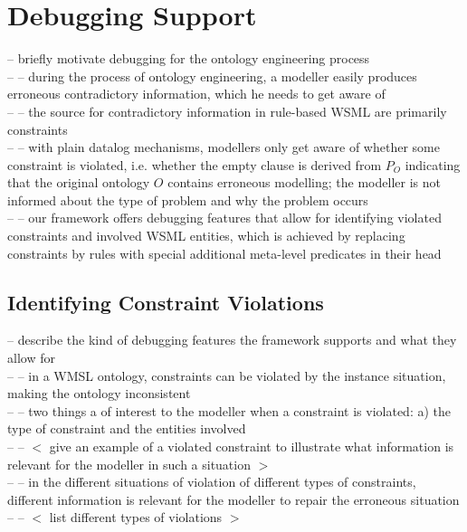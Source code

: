 \def\transdebug{\transtxt{debug}}
\def\pvotype{\predicate{\predsubtxt{v\_otype}}}
\def\pvmincard{\predicate{\predsubtxt{v\_mincard}}}
\def\pvmaxcard{\predicate{\predsubtxt{v\_maxcard}}}
\def\pvuser{\predicate{\predsubtxt{v\_user}}}
\def\axiomid{\ensuremath{Ax_{I\!D}}}

\section{Debugging Support\label{sec:debugging}}
-- briefly motivate debugging for the ontology engineering process \\
-- -- during the process of ontology engineering, a modeller easily produces erroneous contradictory information, which he needs to get aware of \\
-- -- the source for contradictory information in rule-based WSML are primarily constraints \\
-- -- with plain datalog mechanisms, modellers only get aware of whether some constraint is violated, i.e. whether the empty clause is derived from $P_O$ indicating that the original ontology $O$ contains erroneous modelling; the modeller is not informed about the type of problem and why the problem occurs \\
-- -- our framework offers debugging features that allow for identifying violated constraints and involved WSML entities, which is achieved by replacing constraints by rules with special additional meta-level predicates in their head \\

\subsection{Identifying Constraint Violations}
-- describe the kind of debugging features the framework supports and what they allow for \\
-- -- in a WMSL ontology, constraints can be violated by the instance situation, making the ontology inconsistent \\
-- -- two things a of interest to the modeller when a constraint is violated: a) the type of constraint and the entities involved \\
-- -- $<$ give an example of a violated constraint to illustrate what information is relevant for the modeller in such a situation $>$ \\
-- -- in the different situations of violation of different types of constraints, different information is relevant for the modeller to repair the erroneous situation  \\
-- -- $<$ list different types of violations $>$ \\

